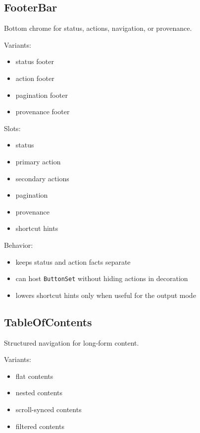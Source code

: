 \subsection{FooterBar}\label{record-128-footerbar}

Bottom chrome for status, actions, navigation, or provenance.

Variants:

\begin{itemize}
\tightlist
\item
  status footer
\item
  action footer
\item
  pagination footer
\item
  provenance footer
\end{itemize}

Slots:

\begin{itemize}
\tightlist
\item
  status
\item
  primary action
\item
  secondary actions
\item
  pagination
\item
  provenance
\item
  shortcut hints
\end{itemize}

Behavior:

\begin{itemize}
\tightlist
\item
  keeps status and action facts separate
\item
  can host \texttt{B\allowbreak{}u\allowbreak{}t\allowbreak{}t\allowbreak{}o\allowbreak{}n\allowbreak{}S\allowbreak{}e\allowbreak{}t} without hiding actions in decoration
\item
  lowers shortcut hints only when useful for the output mode
\end{itemize}

\subsection{TableOfContents}\label{record-128-tableofcontents}

Structured navigation for long-form content.

Variants:

\begin{itemize}
\tightlist
\item
  flat contents
\item
  nested contents
\item
  scroll-synced contents
\item
  filtered contents
\end{itemize}

